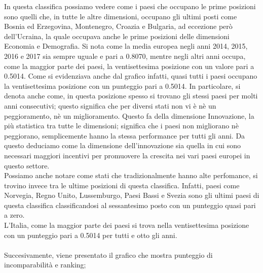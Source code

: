 \documentclass[a4paper,12pt, openright]{report}
\begin{document}
In questa classifica possiamo vedere come i paesi che occupano le prime posizioni sono quelli che, in tutte le altre dimensioni, occupano 
gli 
ultimi posti come Bosnia ed 
Erzegovina, Montenegro, Croazia e Bulgaria, ad eccezione però dell'Ucraina, la quale occupava anche le prime posizioni delle dimensioni
Economia e Demografia. Si nota come
la media europea negli anni 2014, 2015, 2016 e 2017 sia sempre uguale e pari a 0.8070, mentre negli altri anni occupa, come la maggior
parte dei paesi,
la ventisettesima posizione con un valore pari a 0.5014. Come si evidenziava anche dal grafico infatti, quasi tutti i paesi occupano la 
ventisettesima posizione con un 
punteggio pari a 0.5014. In particolare, si denota anche come, in questa posizione spesso si trovano gli stessi paesi per molti anni 
consecutivi; questo significa che 
per diversi stati non vi è nè 
un peggioramento, nè un miglioramento. Questo fa della dimensione Innovazione, la più statistica tra tutte le dimensioni; significa 
che i paesi non migliorano nè peggiorano, semplicemente hanno la stessa performance per tutti gli anni. Da questo deduciamo come la 
dimensione dell'innovazione sia quella in 
cui sono necessari maggiori incentivi per promuovere la crescita nei vari paesi europei in questo settore. \\
Possiamo anche notare come stati che tradizionalmente hanno alte perfomance, si trovino invece tra le ultime posizioni di questa classifica. Infatti, paesi 
come Norvegia, Regno
Unito, Lussemburgo, Paesi Bassi e Svezia sono gli ultimi paesi di questa classifica classificandosi al sessantesimo posto con un punteggio
quasi pari a zero. \\
L'Italia, come la maggior parte dei paesi si trova nella ventisettesima posizione con un punteggio pari a 
0.5014 per tutti e otto gli anni. 
\\
\\
Succesivamente, viene presentato il grafico che mostra punteggio di incomparabilità e ranking; 
\end{document}
